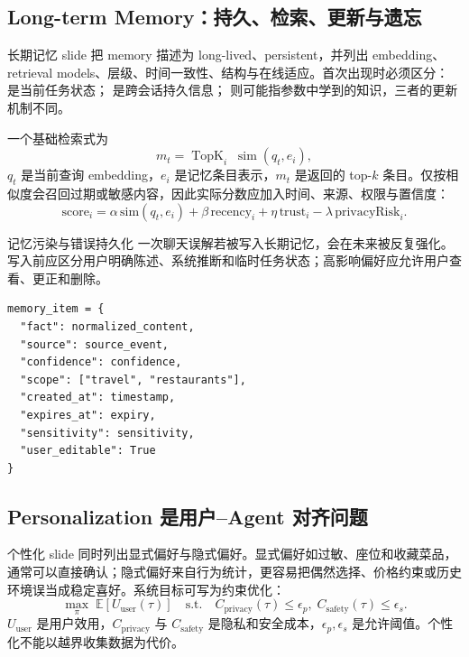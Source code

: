 \subsection{Long-term Memory：持久、检索、更新与遗忘}

长期记忆 slide 把 memory 描述为 long-lived、persistent，并列出 embedding、retrieval models、层级、时间一致性、结构与在线适应。首次出现时必须区分： 是当前任务状态； 是跨会话持久信息； 则可能指参数中学到的知识，三者的更新机制不同。


一个基础检索式为
\[
m_t=\operatorname{TopK}_{i}\;\operatorname{sim}(q_t,e_i),
\]
$q_t$ 是当前查询 embedding，$e_i$ 是记忆条目表示，$m_t$ 是返回的 top-$k$ 条目。仅按相似度会召回过期或敏感内容，因此实际分数应加入时间、来源、权限与置信度：
\[
\text{score}_i=\alpha\,\text{sim}(q_t,e_i)+\beta\,\text{recency}_i+
\eta\,\text{trust}_i-\lambda\,\text{privacyRisk}_i.
\]

\begin{warningbox}{记忆污染与错误持久化}
一次聊天误解若被写入长期记忆，会在未来被反复强化。写入前应区分用户明确陈述、系统推断和临时任务状态；高影响偏好应允许用户查看、更正和删除。
\end{warningbox}

\begin{lstlisting}[caption={带来源和过期策略的记忆记录}]
memory_item = {
  "fact": normalized_content,
  "source": source_event,
  "confidence": confidence,
  "scope": ["travel", "restaurants"],
  "created_at": timestamp,
  "expires_at": expiry,
  "sensitivity": sensitivity,
  "user_editable": True
}
\end{lstlisting}

\subsection{Personalization 是用户--Agent 对齐问题}

个性化 slide 同时列出显式偏好与隐式偏好。显式偏好如过敏、座位和收藏菜品，通常可以直接确认；隐式偏好来自行为统计，更容易把偶然选择、价格约束或历史环境误当成稳定喜好。系统目标可写为约束优化：
\[
\max_\pi\;\mathbb{E}[U_{\text{user}}(\tau)]
\quad\text{s.t.}\quad
C_{\text{privacy}}(\tau)\le \epsilon_p,
\;C_{\text{safety}}(\tau)\le \epsilon_s.
\]
$U_{\text{user}}$ 是用户效用，$C_{\text{privacy}}$ 与 $C_{\text{safety}}$ 是隐私和安全成本，$\epsilon_p,\epsilon_s$ 是允许阈值。个性化不能以越界收集数据为代价。

